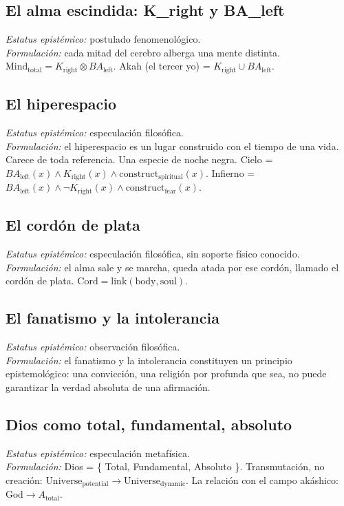 \documentclass[11pt,a4paper]{article}
\begin{document}
\subsection{El alma escindida: K\_right y BA\_left}
\textit{Estatus epistémico:} postulado fenomenológico. \\
\textit{Formulación:} cada mitad del cerebro alberga una mente distinta. $\text{Mind}_{\text{total}} = K_{\text{right}} \otimes BA_{\text{left}}$. Akah (el tercer yo) = $K_{\text{right}} \cup BA_{\text{left}}$.

\subsection{El hiperespacio}
\textit{Estatus epistémico:} especulación filosófica. \\
\textit{Formulación:} el hiperespacio es un lugar construido con el tiempo de una vida. Carece de toda referencia. Una especie de noche negra. Cielo = $BA_{\text{left}}(x) \land K_{\text{right}}(x) \land \text{construct}_{\text{spiritual}}(x)$. Infierno = $BA_{\text{left}}(x) \land \neg K_{\text{right}}(x) \land \text{construct}_{\text{fear}}(x)$.

\subsection{El cordón de plata}
\textit{Estatus epistémico:} especulación filosófica, sin soporte físico conocido. \\
\textit{Formulación:} el alma sale y se marcha, queda atada por ese cordón, llamado el cordón de plata. $\text{Cord} = \text{link}(\text{body}, \text{soul})$.

\subsection{El fanatismo y la intolerancia}
\textit{Estatus epistémico:} observación filosófica. \\
\textit{Formulación:} el fanatismo y la intolerancia constituyen un principio epistemológico: una convicción, una religión por profunda que sea, no puede garantizar la verdad absoluta de una afirmación.

\subsection{Dios como total, fundamental, absoluto}
\textit{Estatus epistémico:} especulación metafísica. \\
\textit{Formulación:} Dios = \{ Total, Fundamental, Absoluto \}. Transmutación, no creación: $\text{Universe}_{\text{potential}} \to \text{Universe}_{\text{dynamic}}$. La relación con el campo akáshico: $\text{God} \to A_{\text{total}}$.
\end{document}
